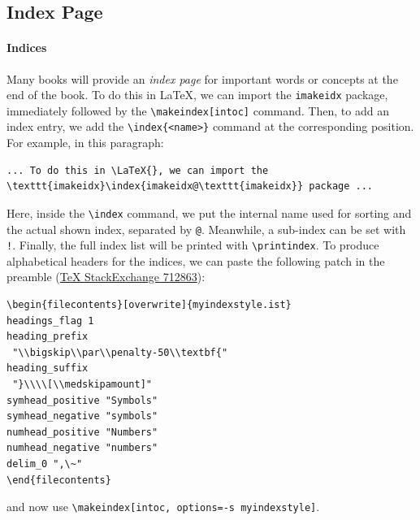 \subsection{Index Page}

\paragraph{Indices}
Many books will provide an \textit{index page} for important words or concepts at the end of the book. To do this in \LaTeX{}, we can import the \texttt{imakeidx} package, immediately followed by the \texttt{\textbackslash makeindex[intoc]} command. Then, to add an index entry, we add the \texttt{\textbackslash index\{<name>\}} command at the corresponding position. For example, in this paragraph:
\begin{lstlisting}
... To do this in \LaTeX{}, we can import the \texttt{imakeidx}\index{imakeidx@\texttt{imakeidx}} package ...    
\end{lstlisting}
Here, inside the \texttt{\textbackslash index} command, we put the internal name used for sorting and the actual shown index, separated by \texttt{@}. Meanwhile, a sub-index can be set with \texttt{!}. Finally, the full index list will be printed with \texttt{\textbackslash printindex}. To produce alphabetical headers for the indices, we can paste the following patch in the preamble (\href{https://tex.stackexchange.com/questions/712863/how-to-make-an-alphabetically-ordered-index-using-imakeidx-package}{\TeX{} StackExchange 712863}):
\begin{lstlisting}
\begin{filecontents}[overwrite]{myindexstyle.ist}
headings_flag 1
heading_prefix
 "\\bigskip\\par\\penalty-50\\textbf{"
heading_suffix
 "}\\\\[\\medskipamount]"
symhead_positive "Symbols"
symhead_negative "symbols"
numhead_positive "Numbers"
numhead_negative "numbers"
delim_0 ",\~"
\end{filecontents}
\end{lstlisting}
and now use \texttt{\textbackslash makeindex[intoc, options=-s myindexstyle]}.